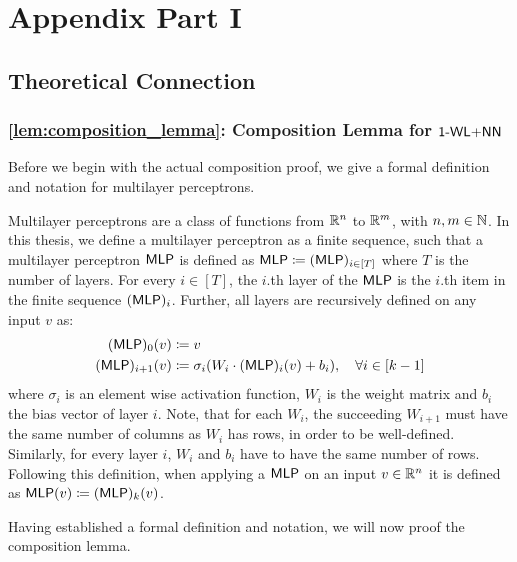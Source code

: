 \appendix
\chapter{Appendix Part I}

\section{Theoretical Connection}

\subsection{\cref{lem:composition_lemma}: Composition Lemma for $\textsf{1-WL+NN}$}\label{app:composition_proof}
Before we begin with the actual composition proof, we give a formal definition and notation for multilayer perceptrons.

\begin{definition}\label{def:mlp}
    Multilayer perceptrons are a class of functions from $\mathbb{R}^n$ to $\mathbb{R}^m$, with $n,m \in \mathbb{N}$. In this thesis, we define a multilayer perceptron as a finite sequence, such that a multilayer perceptron $\textsf{MLP}$ is defined as $\textsf{MLP} \coloneqq (\textsf{MLP})_{i\in[T]}$ where $T$ is the number of layers. For every $i \in [T]$, the $i$.th layer of the $\textsf{MLP}$ is the $i$.th item in the finite sequence $(\textsf{MLP})_i$. Further, all layers are recursively defined on any input $v$ as:
    \begin{align*}
        (\textsf{MLP})_{0}(v) &\coloneqq v\\
        (\textsf{MLP})_{i+1}(v) &\coloneqq \sigma_i(W_i \cdot (\textsf{MLP})_{i} (v) + b_i), \quad \forall i \in [k-1]
    \end{align*}
    where $\sigma_i$ is an element wise activation function, $W_i$ is the weight matrix and $b_i$ the bias vector of layer $i$. Note, that for each $W_i$, the succeeding $W_{i+1}$ must have the same number of columns as $W_i$ has rows, in order to be well-defined. Similarly, for every layer $i$, $W_i$ and $b_i$ have to have the same number of rows.
    Following this definition, when applying a $\textsf{MLP}$ on an input $v \in \mathbb{R}^n$ it is defined as $\textsf{MLP}(v) \coloneqq (\textsf{MLP})_k(v)$.
\end{definition}

Having established a formal definition and notation, we will now proof the \wlnn composition lemma.

